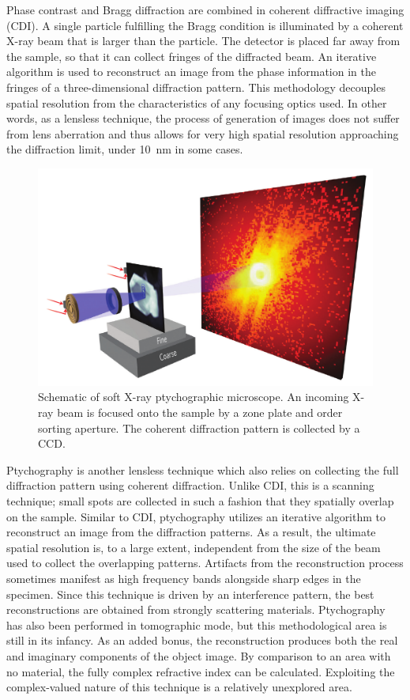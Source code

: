\documentclass[journal=cmatex,manuscript=perspective]{achemso}
\begin{document}
Phase contrast and Bragg diffraction are combined in coherent
diffractive imaging (CDI). A single particle fulfilling the Bragg
condition is illuminated by a coherent X-ray beam that is larger than
the particle. The detector is placed far away from the sample, so that
it can collect fringes of the diffracted beam. An iterative algorithm
is used to reconstruct an image from the phase information in the
fringes of a three-dimensional diffraction
pattern\cite{robinson2009}. This methodology decouples spatial
resolution from the characteristics of any focusing optics used. In
other words, as a lensless technique, the process of generation of
images does not suffer from lens aberration and thus allows for very
high spatial resolution approaching the diffraction limit, under
\SI{10}{nm} in some cases.

\begin{figure}
  \includegraphics[width=\textwidth]{shapiro2014.png}
  \caption{Schematic of soft X-ray ptychographic microscope. An
    incoming X-ray beam is focused onto the sample by a zone plate and
    order sorting aperture. The coherent diffraction pattern is
    collected by a CCD\cite{shapiro2014}.}
  \label{figure:shapiro2014}
\end{figure}

Ptychography is another lensless technique which also relies on
collecting the full diffraction pattern using coherent
diffraction. Unlike CDI, this is a scanning technique; small spots are
collected in such a fashion that they spatially overlap on the
sample. Similar to CDI, ptychography utilizes an iterative algorithm
to reconstruct an image from the diffraction patterns. As a result,
the ultimate spatial resolution is, to a large extent, independent
from the size of the beam used to collect the overlapping
patterns. Artifacts from the reconstruction process sometimes manifest
as high frequency bands alongside sharp edges in the specimen. Since
this technique is driven by an interference pattern, the best
reconstructions are obtained from strongly scattering
materials. Ptychography has also been performed in tomographic
mode\cite{venkatakrishnan2016}, but this methodological area is still
in its infancy. As an added bonus, the reconstruction produces both
the real and imaginary components of the object image. By comparison
to an area with no material, the fully complex refractive index can be
calculated. Exploiting the complex-valued nature of this technique is
a relatively unexplored area.
\end{document}
